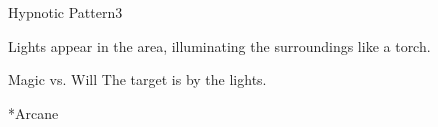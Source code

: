 \begin{spellsection}{Hypnotic Pattern}{3}
\begin{spellheader}
\end{spellheader}
\begin{spellcontent}
    \begin{spelltargetinginfo}
    \end{spelltargetinginfo}
    \begin{spelleffects}
        \spelleffect Lights appear in the area, illuminating the surroundings like a torch.
        \spelldur \durshort
    \end{spelleffects}
\end{spellcontent}
\begin{spellsubcontent}
    \begin{spelltargetinginfo}
    \end{spelltargetinginfo}
    \begin{spelleffects}
        \begin{spellattack}{Magic vs. Will}
            \spellsuccess The target is \fascinated by the lights.
        \end{spellattack}
    \end{spelleffects}
\end{spellsubcontent}
\begin{spellfooter}
    *{Arcane}
\end{spellfooter}

\begin{comment}
\subsubsection{I}
\end{comment}
\end{spellsection}

